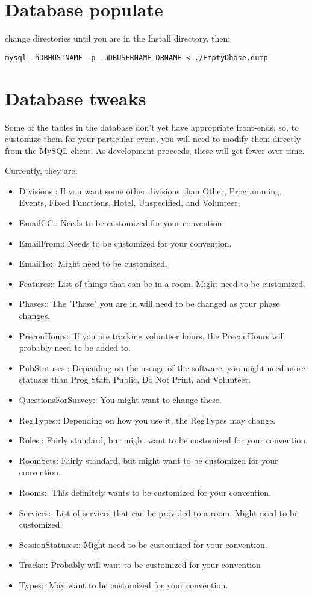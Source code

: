 \documentclass[captions=tablesignature]{scrartcl}
\begin{document}
\section{Database populate}
\label{sec-5}
change directories until you are in the Install directory, then:
\begin{verbatim}
mysql -hDBHOSTNAME -p -uDBUSERNAME DBNAME < ./EmptyDbase.dump
\end{verbatim}

\section{Database tweaks}
\label{sec-6}
Some of the tables in the database don't yet have appropriate
front-ends, so, to customize them for your particular event, you
will need to modify them directly from the MySQL client.  As
development proceeds, these will get fewer over time.

Currently, they are:
\begin{itemize}
\item Divisions:: If you want some other divisions than Other,
Programming, Events, Fixed Functions, Hotel, Unspecified, and
Volunteer.
\item EmailCC:: Needs to be customized for your convention.
\item EmailFrom:: Needs to be customized for your convention.
\item EmailTo:: Might need to be customized.
\item Features:: List of things that can be in a room.  Might need to be
customized.
\item Phases:: The "Phase" you are in will need to be changed as your
phase changes.
\item PreconHours:: If you are tracking volunteer hours, the PreconHours
will probably need to be added to.
\item PubStatuses:: Depending on the useage of the software, you might
need more statuses than Prog Staff, Public, Do Not Print, and
Volunteer.
\item QuestionsForSurvey:: You might want to change these.
\item RegTypes:: Depending on how you use it, the RegTypes may change.
\item Roles:: Fairly standard, but might want to be customized for your
convention.
\item RoomSets: Fairly standard, but might want to be customized for
your convention.
\item Rooms:: This definitely wants to be customized for your
convention.
\item Services:: List of services that can be provided to a room.  Might
need to be customized.
\item SessionStatuses:: Might need to be customized for your
convention.
\item Tracks:: Probably will want to be customized for your convention
\item Types:: May want to be customized for your convention.
\end{itemize}
\end{document}
